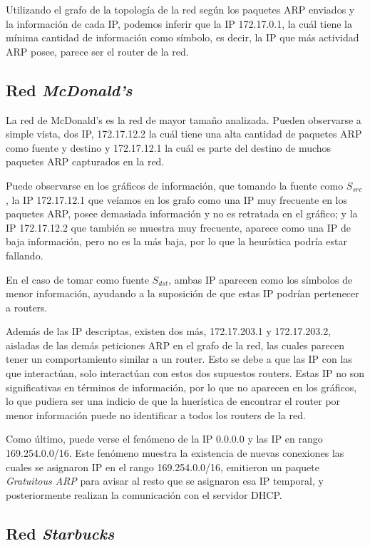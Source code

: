 \documentclass[a4paper, 10pt, twoside]{article}
\begin{document}
Utilizando el grafo de la topología de la red según los paquetes ARP enviados y la información de cada IP, podemos inferir que la IP 172.17.0.1, la cuál tiene la mínima cantidad de información como símbolo, es decir, la IP que más actividad ARP posee, parece ser el router de la red.


\subsection{Red \emph{McDonald's}}

La red de McDonald's es la red de mayor tamaño analizada. Pueden observarse a simple vista, dos IP, 172.17.12.2 la cuál tiene una alta cantidad de paquetes ARP como fuente y destino y 172.17.12.1 la cuál es parte del destino de muchos paquetes ARP capturados en la red.

Puede observarse en los gráficos de información, que tomando la fuente como $S_{src}$, la IP 172.17.12.1 que veíamos en los grafo como una IP muy frecuente en los paquetes ARP, posee demasiada información y no es retratada en el gráfico; y la IP 172.17.12.2 que también se muestra muy frecuente, aparece como una IP de baja información, pero no es la más baja, por lo que la heurística podría estar fallando.

En el caso de tomar como fuente $S_{dst}$, ambas IP aparecen como los símbolos de menor información, ayudando a la suposición de que estas IP podrían  pertenecer a routers.

Además de las IP descriptas, existen dos más, 172.17.203.1 y 172.17.203.2, aisladas de las demás peticiones ARP en el grafo de la red, las cuales parecen tener un comportamiento similar a un router. Esto se debe a que las IP con las que interactúan, solo interactúan con estos dos supuestos routers. Estas IP no son significativas en términos de información, por lo que no aparecen en los gráficos, lo que pudiera ser una indicio de que la huerística de encontrar el router por menor información puede no identificar a todos los routers de la red. 

Como último, puede verse el fenómeno de la IP 0.0.0.0 y las IP en rango 169.254.0.0/16. Este fenómeno muestra la existencia de nuevas conexiones las cuales se asignaron IP en el rango 169.254.0.0/16, emitieron un paquete \textit{Gratuitous ARP} para avisar al resto que se asignaron esa IP temporal, y posteriormente realizan la comunicación con el servidor DHCP.


\subsection{Red \emph{Starbucks}}
\end{document}
